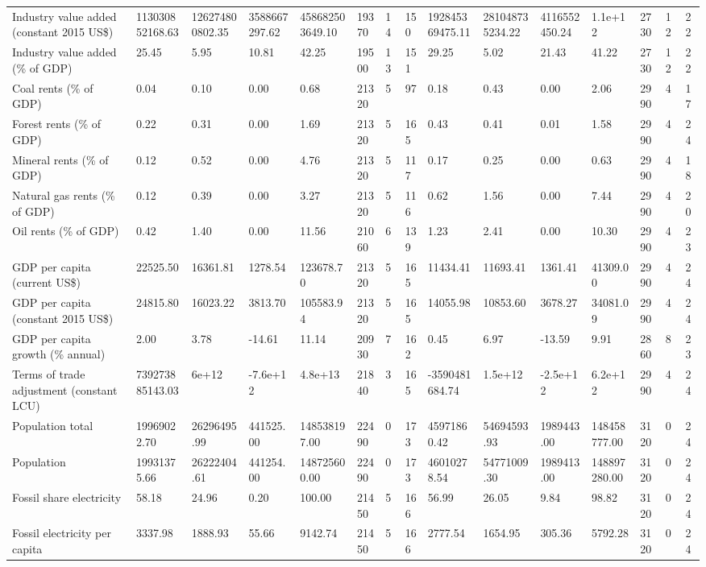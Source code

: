\begin{longtable}{lllllllllllllll}
Industry value added (constant 2015 US\$) & 113030852168.63 & 126274800802.35 & 3588667297.62 & 458682503649.10 & 19370 & 14 & 150 & 192845369475.11 & 281048735234.22 & 4116552450.24 & 1.1e+12 & 2730 & 12 & 22\\
Industry value added (\% of GDP) & 25.45 & 5.95 & 10.81 & 42.25 & 19500 & 13 & 151 & 29.25 & 5.02 & 21.43 & 41.22 & 2730 & 12 & 22\\
Coal rents (\% of GDP) & 0.04 & 0.10 & 0.00 & 0.68 & 21320 & 5 & 97 & 0.18 & 0.43 & 0.00 & 2.06 & 2990 & 4 & 17\\
Forest rents (\% of GDP) & 0.22 & 0.31 & 0.00 & 1.69 & 21320 & 5 & 165 & 0.43 & 0.41 & 0.01 & 1.58 & 2990 & 4 & 24\\
\addlinespace
Mineral rents (\% of GDP) & 0.12 & 0.52 & 0.00 & 4.76 & 21320 & 5 & 117 & 0.17 & 0.25 & 0.00 & 0.63 & 2990 & 4 & 18\\
Natural gas rents (\% of GDP) & 0.12 & 0.39 & 0.00 & 3.27 & 21320 & 5 & 116 & 0.62 & 1.56 & 0.00 & 7.44 & 2990 & 4 & 20\\
Oil rents (\% of GDP) & 0.42 & 1.40 & 0.00 & 11.56 & 21060 & 6 & 139 & 1.23 & 2.41 & 0.00 & 10.30 & 2990 & 4 & 23\\
GDP per capita (current US\$) & 22525.50 & 16361.81 & 1278.54 & 123678.70 & 21320 & 5 & 165 & 11434.41 & 11693.41 & 1361.41 & 41309.00 & 2990 & 4 & 24\\
GDP per capita (constant 2015 US\$) & 24815.80 & 16023.22 & 3813.70 & 105583.94 & 21320 & 5 & 165 & 14055.98 & 10853.60 & 3678.27 & 34081.09 & 2990 & 4 & 24\\
\addlinespace
GDP per capita growth (\% annual) & 2.00 & 3.78 & -14.61 & 11.14 & 20930 & 7 & 162 & 0.45 & 6.97 & -13.59 & 9.91 & 2860 & 8 & 23\\
Terms of trade adjustment (constant LCU) & 739273885143.03 & 6e+12 & -7.6e+12 & 4.8e+13 & 21840 & 3 & 165 & -3590481684.74 & 1.5e+12 & -2.5e+12 & 6.2e+12 & 2990 & 4 & 24\\
Population total & 19969022.70 & 26296495.99 & 441525.00 & 148538197.00 & 22490 & 0 & 173 & 45971860.42 & 54694593.93 & 1989443.00 & 148458777.00 & 3120 & 0 & 24\\
Population & 19931375.66 & 26222404.61 & 441254.00 & 148725600.00 & 22490 & 0 & 173 & 46010278.54 & 54771009.30 & 1989413.00 & 148897280.00 & 3120 & 0 & 24\\
Fossil share electricity & 58.18 & 24.96 & 0.20 & 100.00 & 21450 & 5 & 166 & 56.99 & 26.05 & 9.84 & 98.82 & 3120 & 0 & 24\\
\addlinespace
Fossil electricity per capita & 3337.98 & 1888.93 & 55.66 & 9142.74 & 21450 & 5 & 166 & 2777.54 & 1654.95 & 305.36 & 5792.28 & 3120 & 0 & 24\\

\end{longtable}
